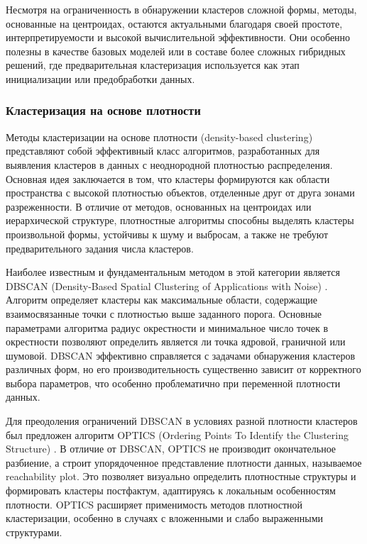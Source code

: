             Несмотря на ограниченность в обнаружении кластеров сложной формы, методы, основанные на центроидах, остаются актуальными благодаря своей простоте, интерпретируемости и высокой вычислительной эффективности. Они особенно полезны в качестве базовых моделей или в составе более сложных гибридных решений, где предварительная кластеризация используется как этап инициализации или предобработки данных.

        \subsubsection{Кластеризация на основе плотности}

            Методы кластеризации на основе плотности (density-based clustering) представляют собой эффективный класс алгоритмов, разработанных для выявления кластеров в данных с неоднородной плотностью распределения. Основная идея заключается в том, что кластеры формируются как области пространства с высокой плотностью объектов, отделенные друг от друга зонами разреженности. В отличие от методов, основанных на центроидах или иерархической структуре, плотностные алгоритмы способны выделять кластеры произвольной формы, устойчивы к шуму и выбросам, а также не требуют предварительного задания числа кластеров.

            Наиболее известным и фундаментальным методом в этой категории является DBSCAN (Density-Based Spatial Clustering of Applications with Noise) \cite{Ester1996DBSCAN}. Алгоритм определяет кластеры как максимальные области, содержащие взаимосвязанные точки с плотностью выше заданного порога. Основные параметрами алгоритма радиус окрестности и минимальное число точек в окрестности позволяют определить является ли точка ядровой, граничной или шумовой. DBSCAN эффективно справляется с задачами обнаружения кластеров различных форм, но его производительность существенно зависит от корректного выбора параметров, что особенно проблематично при переменной плотности данных.

            Для преодоления ограничений DBSCAN в условиях разной плотности кластеров был предложен алгоритм OPTICS (Ordering Points To Identify the Clustering Structure) \cite{Ankerst1999OPTICS}. В отличие от DBSCAN, OPTICS не производит окончательное разбиение, а строит упорядоченное представление плотности данных, называемое reachability plot. Это позволяет визуально определить плотностные структуры и формировать кластеры постфактум, адаптируясь к локальным особенностям плотности. OPTICS расширяет применимость методов плотностной кластеризации, особенно в случаях с вложенными и слабо выраженными структурами.

